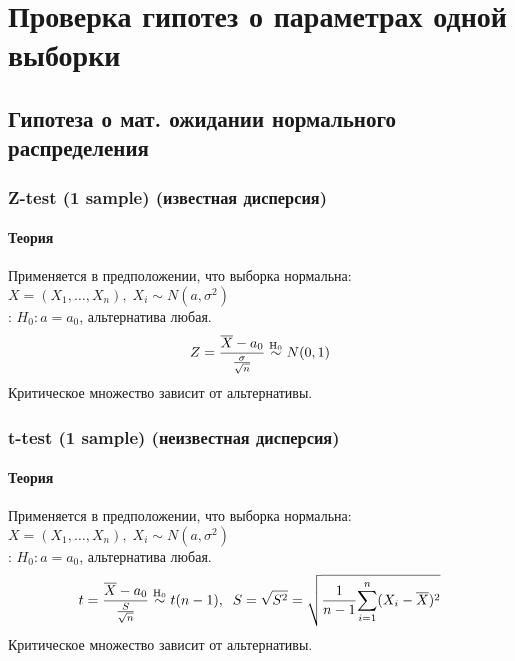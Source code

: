 \chapter{Проверка гипотез о параметрах одной выборки}\label{cha:1sample}

\section{Гипотеза о мат. ожидании нормального распределения}\label{cha:1sample/sec:mo}

\subsection{Z-test (1 sample) (известная дисперсия)}\label{cha:1sample/sec:mo/subsec:ztest}

\subsubsection*{Теория}\label{cha:1sample/sec:mo/subsec:ztest/subsubsec:theory}

Применяется в предположении, что выборка нормальна: \\$X = (X_1, \dots, X_n), \; X_i \sim N(a, \sigma^2)$\\
: $H_0: a = a_0$, альтернатива любая.
$$Z = \frac{\overline{X} - a_0}{\frac{\sigma}{\sqrt{n}}} \mathrel{\stackrel{\rm H_0}\sim} N(0,1)$$
Критическое множество зависит от альтернативы.

\subsection{t-test (1 sample) (неизвестная дисперсия)}\label{cha:1sample/sec:mo/subsec:ttest}

\subsubsection*{Теория}\label{cha:1sample/sec:mo/subsec:ttest/subsubsec:theory}

Применяется в предположении, что выборка нормальна: \\$X = (X_1, \dots, X_n), \; X_i \sim N(a, \sigma^2)$\\
: $H_0: a = a_0$, альтернатива любая.
$$t = \frac{\overline{X} - a_0}{\frac{S}{\sqrt{n}}} \mathrel{\stackrel{\rm H_0}\sim} t(n-1), \;\; S = \sqrt{S^2} = \sqrt{\frac{1}{n-1} \underset{i=1}{\overset{n}{\sum}}(X_i - \overline{X})^2}$$
Критическое множество зависит от альтернативы.

